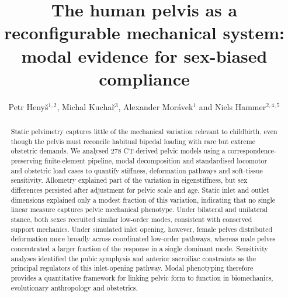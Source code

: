 \documentclass[openacc]{rsproca_new}
\begin{document}
\title{The human pelvis as a reconfigurable mechanical system: modal evidence for sex-biased compliance}

\author{Petr Heny\v{s}$^{1,2}$, Michal Kucha\v{r}$^{3}$, Alexander Mor\'avek$^{1}$ and Niels Hammer$^{2,4,5}$}

\address{$^{1}$Institute of New Technologies and Applied Informatics, Faculty of Mechatronics, Informatics and Interdisciplinary Studies, Technical University of Liberec, Liberec, Czech Republic\\
$^{2}$Division of Macroscopic and Clinical Anatomy, Gottfried Schatz Research Center, Medical University of Graz, Graz, Austria\\
$^{3}$Department of Anatomy, Faculty of Medicine in Hradec Kr\'alov\'e, Charles University, Hradec Kr\'alov\'e, Czech Republic\\
$^{4}$Department of Orthopaedic and Trauma Surgery, University of Leipzig, Leipzig, Germany\\
$^{5}$Division of Biomechatronics, Fraunhofer IWU, Dresden, Germany}

\subject{biomechanics, evolutionary anthropology, obstetrics}

\begin{abstract}
Static pelvimetry captures little of the mechanical variation relevant to childbirth, even though the pelvis must reconcile habitual bipedal loading with rare but extreme obstetric demands. We analysed 278 CT-derived pelvic models using a correspondence-preserving finite-element pipeline, modal decomposition and standardised locomotor and obstetric load cases to quantify stiffness, deformation pathways and soft-tissue sensitivity. Allometry explained part of the variation in eigenstiffness, but sex differences persisted after adjustment for pelvic scale and age. Static inlet and outlet dimensions explained only a modest fraction of this variation, indicating that no single linear measure captures pelvic mechanical phenotype. Under bilateral and unilateral stance, both sexes recruited similar low-order modes, consistent with conserved support mechanics. Under simulated inlet opening, however, female pelves distributed deformation more broadly across coordinated low-order pathways, whereas male pelves concentrated a larger fraction of the response in a single dominant mode. Sensitivity analyses identified the pubic symphysis and anterior sacroiliac constraints as the principal regulators of this inlet-opening pathway. Modal phenotyping therefore provides a quantitative framework for linking pelvic form to function in biomechanics, evolutionary anthropology and obstetrics.
\end{abstract}
\end{document}
